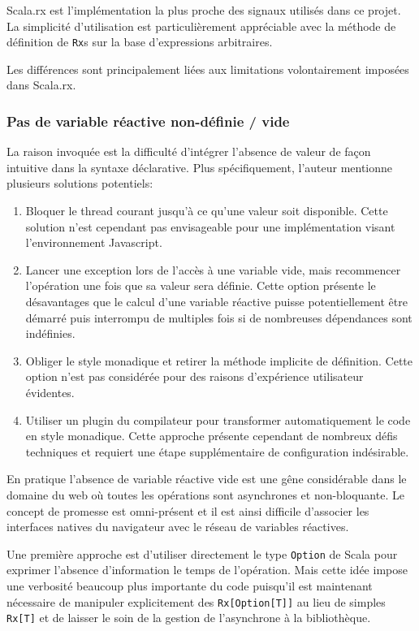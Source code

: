 Scala.rx est l'implémentation la plus proche des signaux utilisés dans ce projet. La simplicité d'utilisation est particulièrement appréciable avec la méthode de définition de \texttt{Rx}s sur la base d'expressions arbitraires.

Les différences sont principalement liées aux limitations volontairement imposées dans Scala.rx.

\subsubsection{Pas de variable réactive non-définie / vide}

La raison invoquée est la difficulté d'intégrer l'absence de valeur de façon intuitive dans la syntaxe déclarative. Plus spécifiquement, l'auteur mentionne plusieurs solutions potentiels:
\begin{enumerate}
	\item Bloquer le thread courant jusqu'à ce qu'une valeur soit disponible. Cette solution n'est cependant pas envisageable pour une implémentation visant l'environnement Javascript.
	\item Lancer une exception lors de l'accès à une variable vide, mais recommencer l'opération une fois que sa valeur sera définie. Cette option présente le désavantages que le calcul d'une variable réactive puisse potentiellement être démarré puis interrompu de multiples fois si de nombreuses dépendances sont indéfinies.
	\item Obliger le style monadique et retirer la méthode implicite de définition. Cette option n'est pas considérée pour des raisons d'expérience utilisateur évidentes.
	\item Utiliser un plugin du compilateur pour transformer automatiquement le code en style monadique. Cette approche présente cependant de nombreux défis techniques et requiert une étape supplémentaire de configuration indésirable.
\end{enumerate}

En pratique l'absence de variable réactive vide est une gêne considérable dans le domaine du web où toutes les opérations sont asynchrones et non-bloquante. Le concept de promesse est omni-présent et il est ainsi difficile d'associer les interfaces natives du navigateur avec le réseau de variables réactives.

Une première approche est d'utiliser directement le type \texttt{Option} de Scala pour exprimer l'absence d'information le temps de l'opération. Mais cette idée impose une verbosité beaucoup plus importante du code puisqu'il est maintenant nécessaire de manipuler explicitement des \texttt{Rx[Option[T]]} au lieu de simples \texttt{Rx[T]} et de laisser le soin de la gestion de l'asynchrone à la bibliothèque.


